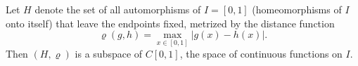Let $H$ denote the set of all automorphisms of $I = [0,1]$ (homeomorphisms of $I$ onto itself) that leave the endpoints fixed, metrized by the distance function
$$\varrho(g, h) = \max_{x \in [0,1]} |g(x) - h(x)|.$$
Then $(H, \varrho)$ is a subspace of $C[0,1]$, the space of continuous functions on $I$.
